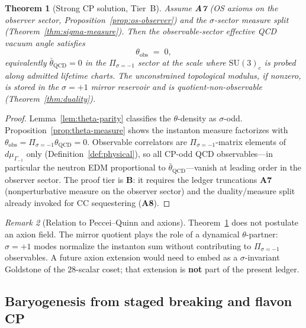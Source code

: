 \documentclass[11pt]{article}
\theoremstyle{plain}
\newtheorem{theorem}{Theorem}[section]
\theoremstyle{definition}
\theoremstyle{remark}
\newtheorem{remark}[theorem]{Remark}
\numberwithin{equation}{section}
\begin{document}
\begin{theorem}[Strong CP solution, Tier~B]\label{thm:strong-cp}
Assume \textbf{A7} (OS axioms on the observer sector,
Proposition~\ref{prop:os-observer}) and the $\sigma$-sector measure split
(Theorem~\ref{thm:sigma-measure}). Then the observable-sector effective QCD
vacuum angle satisfies
\begin{equation}\label{eq:theta-zero}
  \theta_{\mathrm{obs}} \;=\; 0,
\end{equation}
equivalently $\bar\theta_{\mathrm{QCD}}=0$ in the $\Pi_{\sigma=-1}$ sector
at the scale where $\mathrm{SU}(3)_c$ is probed along admitted lifetime charts.
The unconstrained topological modulus, if nonzero, is stored in the
$\sigma=+1$ mirror reservoir and is quotient-non-observable
(Theorem~\ref{thm:duality}).
\end{theorem}

\begin{proof}
Lemma~\ref{lem:theta-parity} classifies the $\theta$-density as $\sigma$-odd.
Proposition~\ref{prop:theta-measure} shows the instanton measure factorizes
with $\theta_{\mathrm{obs}}=\Pi_{\sigma=-1}\theta_{\mathrm{QCD}}=0$.
Observable correlators are $\Pi_{\sigma=-1}$-matrix elements of
$d\mu_{\Gamma_{-1}}$ only (Definition~\ref{def:physical}), so all
CP-odd QCD observables---in particular the neutron EDM proportional to
$\bar\theta_{\mathrm{QCD}}$---vanish at leading order in the observer sector.
The proof tier is \textbf{B}: it requires the ledger truncations \textbf{A7}
(nonperturbative measure on the observer sector) and the duality/measure split
already invoked for CC sequestering (\textbf{A8}).
\end{proof}

\begin{remark}[Relation to Peccei--Quinn and axions]
Theorem~\ref{thm:strong-cp} does not postulate an axion field. The mirror
quotient plays the role of a dynamical $\theta$-partner: $\sigma=+1$ modes
normalize the instanton sum without contributing to $\Pi_{\sigma=-1}$
observables. A future axion extension would need to embed as a
$\sigma$-invariant Goldstone of the $28$-scalar coset; that extension is
\textbf{not} part of the present ledger.
\end{remark}

\subsection{Baryogenesis from staged breaking and flavon CP}
\label{sec:baryogenesis:sakharov}
\end{document}
